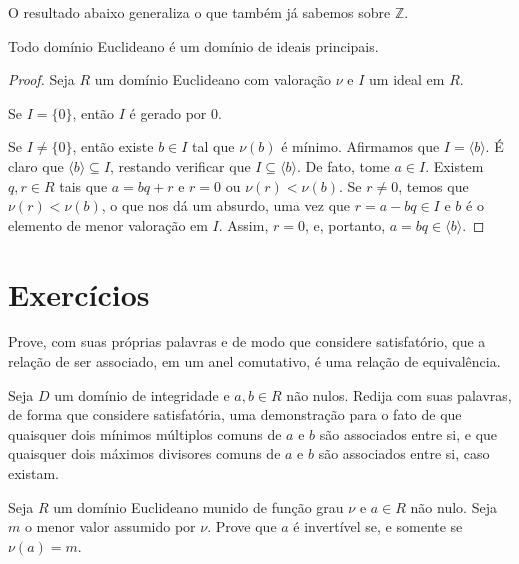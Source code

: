 O resultado abaixo generaliza o que também já sabemos sobre $\mathbb Z$.
\begin{prop}
Todo domínio Euclideano é um domínio de ideais principais.
\end{prop}
\begin{proof}
    Seja $R$ um domínio Euclideano com valoração $\nu$ e $I$ um ideal em $R$.

    Se $I=\{0\}$, então $I$ é gerado por $0$.

    Se $I\neq \{0\}$, então existe $b\in I$ tal que $\nu(b)$ é mínimo.
    Afirmamos que $I=\langle b\rangle$.
    É claro que $\langle b\rangle\subseteq I$, restando verificar que $I\subseteq \langle b\rangle$.
    De fato, tome $a \in I$.
    Existem $q, r \in R$ tais que $a=bq+r$ e $r=0$ ou $\nu(r)<\nu(b)$.
    Se $r\neq 0$, temos que $\nu(r)<\nu(b)$, o que nos dá um absurdo, uma vez que $r=a-bq\in I$ e $b$ é o elemento de menor valoração em $I$.
    Assim, $r=0$, e, portanto, $a=bq\in \langle b\rangle$.
\end{proof}






\section{Exercícios}

\begin{exer}
    Prove, com suas próprias palavras e de modo que considere satisfatório, que a relação de ser associado, em um anel comutativo, é uma relação de equivalência.
\end{exer}

\begin{exer}
    Seja $D$ um domínio de integridade e $a, b \in R$ não nulos.
    Redija com suas palavras, de forma que considere satisfatória, uma demonstração para o fato de que quaisquer dois mínimos múltiplos comuns de $a$ e $b$ são associados entre si, e que quaisquer dois máximos divisores comuns de $a$ e $b$ são associados entre si, caso existam.
\end{exer}
\begin{exer}
    Seja $R$ um domínio Euclideano munido de função grau $\nu$ e $a \in R$ não nulo.
    Seja $m$ o menor valor assumido por $\nu$.
    Prove que $a$ é invertível se, e somente se $\nu(a)=m$.
\end{exer}
